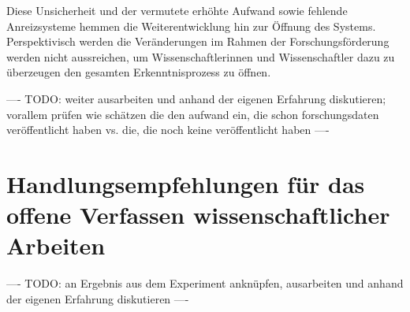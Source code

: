 Diese Unsicherheit und der vermutete erhöhte Aufwand sowie fehlende Anreizsysteme hemmen die Weiterentwicklung hin zur Öffnung des Systems. Perspektivisch werden die Veränderungen im Rahmen der Forschungsförderung werden nicht aussreichen, um Wissenschaftlerinnen und Wissenschaftler dazu zu überzeugen den gesamten Erkenntnisprozess zu öffnen.

---- TODO: weiter ausarbeiten und anhand der eigenen Erfahrung diskutieren; vorallem prüfen wie schätzen die den aufwand ein, die schon forschungsdaten veröffentlicht haben vs. die, die noch keine veröffentlicht haben ----

\section{Handlungsempfehlungen für das offene Verfassen wissenschaftlicher Arbeiten}

---- TODO: an Ergebnis aus dem Experiment anknüpfen, ausarbeiten und anhand der eigenen Erfahrung diskutieren ----
